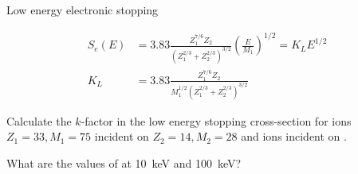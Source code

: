 \begin{enumerate}
      Low energy electronic stopping

      \begin{align*}
        S_e(E) &= 3.83\frac{Z_1^{7/6}Z_2}{(Z_1^{2/3} +
        Z_2^{2/3})^{3/2}} \left( \frac{E}{M_1} \right)^{1/2} = K_LE^{1/2} \\
        K_L &= 3.83\frac{Z_1^{7/6}Z_2}{M_1^{1/2}(Z_1^{2/3} + Z_2^{2/3})^{3/2}}
      \end{align*}

      Calculate the $k$-factor in the low energy stopping cross-section
      for  ions $Z_1 = 33, M_1 = 75$ incident on 
      $Z_2 = 14, M_2 = 28$ and  ions incident on .\par

      What are the values of  at \SI{10}{\kilo\electronvolt}
      and \SI{100}{\kilo\electronvolt}? \par

  \end{enumerate}

  
